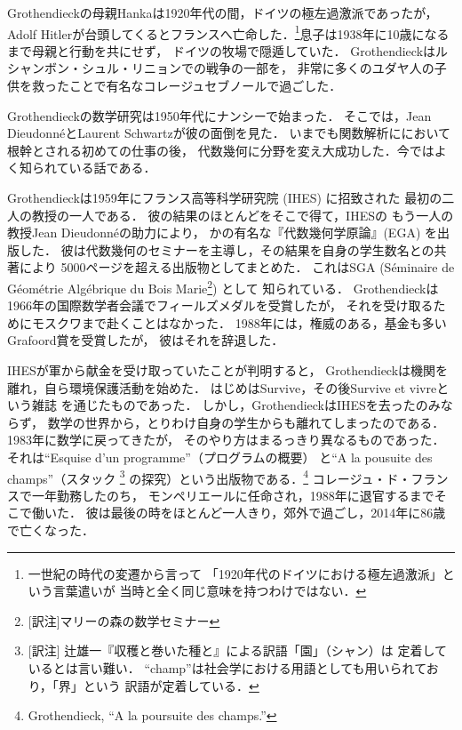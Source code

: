 \documentclass[9pt, a4paper, dvipdfmx]{jlreq}
\theoremstyle{definition}
\theoremstyle{mystyle}
\numberwithin{equation}{section} %
\begin{document}
Grothendieckの母親Hankaは1920年代の間，ドイツの極左過激派であったが，
Adolf Hitlerが台頭してくるとフランスへ亡命した．\footnote[16]{
    一世紀の時代の変遷から言って
    「1920年代のドイツにおける極左過激派」という言葉遣いが
    当時と全く同じ意味を持つわけではない．
}息子は1938年に10歳になるまで母親と行動を共にせず，
ドイツの牧場で隠遁していた．
Grothendieckはルシャンボン・シュル・リニョンでの戦争の一部を，
非常に多くのユダヤ人の子供を救ったことで有名なコレージュセブノールで過ごした．

Grothendieckの数学研究は1950年代にナンシーで始まった．
そこでは，Jean Dieudonn\'eとLaurent Schwartzが彼の面倒を見た．
いまでも関数解析ににおいて根幹とされる初めての仕事の後，
代数幾何に分野を変え大成功した．今ではよく知られている話である．

Grothendieckは1959年にフランス高等科学研究院 (IHES) に招致された
最初の二人の教授の一人である．
彼の結果のほとんどをそこで得て，IHESの
もう一人の教授Jean Dieudonn\'eの助力により，
かの有名な『代数幾何学原論』(EGA) を出版した．
彼は代数幾何のセミナーを主導し，その結果を自身の学生数名との共著により
5000ページを超える出版物としてまとめた．
これはSGA (S\'eminaire de G\'eom\'etrie Alg\'ebrique 
du Bois Marie\footnote{[訳注]マリーの森の数学セミナー}) として
知られている．
Grothendieckは1966年の国際数学者会議でフィールズメダルを受賞したが，
それを受け取るためにモスクワまで赴くことはなかった．
1988年には，権威のある，基金も多いGrafoord賞を受賞したが，
彼はそれを辞退した．

IHESが軍から献金を受け取っていたことが判明すると，
Grothendieckは機関を離れ，自ら環境保護活動を始めた．
はじめはSurvive，その後Survive et vivreという雑誌
を通じたものであった．
しかし，GrothendieckはIHESを去ったのみならず，
数学の世界から，とりわけ自身の学生からも離れてしまったのである．
1983年に数学に戻ってきたが，
そのやり方はまるっきり異なるものであった．
それは``Esquise d'un programme''（プログラムの概要）
と``A la pousuite des champs''（スタック
\footnote{[訳注]
    辻雄一『収穫と巻いた種と』による訳語「園」（シャン）は
    定着しているとは言い難い．
    ``champ''は社会学における用語としても用いられており，「界」という
    訳語が定着している．}
の探究）という出版物である．\footnote[17]{
    Grothendieck, ``A la poursuite des champs.''
}
コレージュ・ド・フランスで一年勤務したのち，
モンペリエールに任命され，1988年に退官するまでそこで働いた．
彼は最後の時をほとんど一人きり，郊外で過ごし，2014年に86歳で亡くなった．

\end{document}
